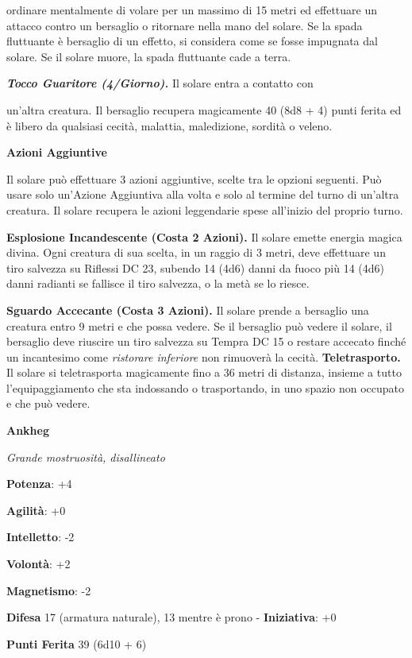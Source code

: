 \begin{multicols}{2}
ordinare mentalmente di volare per un massimo di 15 metri ed effettuare
un attacco contro un bersaglio o ritornare nella mano del solare. Se la
spada fluttuante è bersaglio di un effetto, si considera come se fosse
impugnata dal solare. Se il solare muore, la spada fluttuante cade a
terra.

\emph{\textbf{Tocco Guaritore (4/Giorno).}} Il solare entra a contatto
con

un'altra creatura. Il bersaglio recupera magicamente 40 (8d8 + 4) punti
ferita ed è libero da qualsiasi cecità, malattia, maledizione, sordità o
veleno.

\textbf{Azioni Aggiuntive}

Il solare può effettuare 3 azioni aggiuntive, scelte tra le opzioni
seguenti. Può usare solo un'Azione Aggiuntiva alla volta e solo al
termine del turno di un'altra creatura. Il solare recupera le azioni
leggendarie spese all'inizio del proprio turno.

\textbf{Esplosione Incandescente (Costa 2 Azioni).} Il solare emette
energia magica divina. Ogni creatura di sua scelta, in un raggio di 3
metri, deve effettuare un tiro salvezza su Riflessi DC 23, subendo 14
(4d6) danni da fuoco più 14 (4d6) danni radianti se fallisce il tiro
salvezza, o la metà se lo riesce.

\textbf{Sguardo Accecante (Costa 3 Azioni).} Il solare prende a
bersaglio una creatura entro 9 metri e che possa vedere. Se il bersaglio
può vedere il solare, il bersaglio deve riuscire un tiro salvezza su Tempra DC 15 o restare accecato finché un incantesimo come
\emph{ristorare inferiore} non rimuoverà la cecità.
\textbf{Teletrasporto.} Il solare si teletrasporta magicamente fino a 36
metri di distanza, insieme a tutto l'equipaggiamento che sta indossando
o trasportando, in uno spazio non occupato e che può vedere.



\textbf{Ankheg}

\emph{Grande mostruosità, disallineato}

\textbf{Potenza}: +4

\textbf{Agilità}: +0

\textbf{Intelletto}: -2

\textbf{Volontà}: +2

\textbf{Magnetismo}: -2

\textbf{Difesa} 17 (armatura naturale), 13 mentre è prono - \textbf{Iniziativa}: +0

\textbf{Punti Ferita} 39 (6d10 + 6)


\end{multicols}
